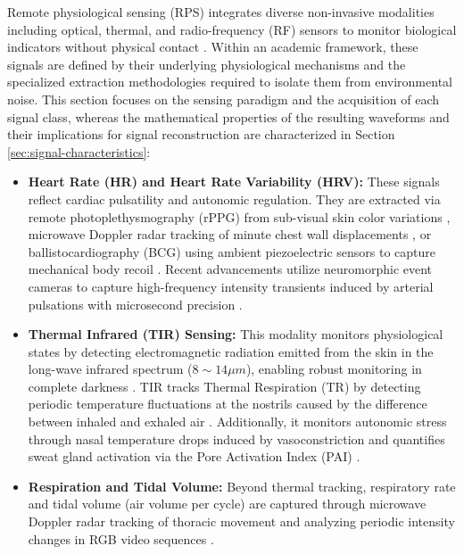 Remote physiological sensing (RPS) integrates diverse non-invasive modalities
including optical, thermal, and radio-frequency (RF) sensors to monitor
biological indicators without physical contact \cite{hassanpour2025contactless}.
Within an academic framework, these signals are defined by their underlying
physiological mechanisms and the specialized extraction methodologies required
to isolate them from environmental noise. This section focuses on the sensing
paradigm and the acquisition of each signal class, whereas the mathematical
properties of the resulting waveforms and their implications for signal
reconstruction are characterized in Section \ref{sec:signal-characteristics}:
\begin{itemize}
    \item \textbf{Heart Rate (HR) and Heart Rate Variability (HRV):} These
        signals reflect cardiac pulsatility and autonomic regulation. They are extracted
        via remote photoplethysmography (rPPG) from sub-visual skin color variations
        \cite{wang2017algorithmic}, microwave Doppler radar tracking of minute
        chest wall displacements \cite{islam2022radar}, or ballistocardiography (BCG)
        using ambient piezoelectric sensors to capture mechanical body recoil \cite{kjaer2026bcgfm}.
        Recent advancements utilize neuromorphic event cameras to capture high-frequency
        intensity transients induced by arterial pulsations with microsecond
        precision \cite{feng2026empd}.

    \item \textbf{Thermal Infrared (TIR) Sensing:} This modality monitors
        physiological states by detecting electromagnetic radiation emitted from
        the skin in the long-wave infrared spectrum ($8 \sim 14 \mu m$), enabling
        robust monitoring in complete darkness \cite{cho2019physiological}. TIR
        tracks Thermal Respiration (TR) by detecting periodic temperature
        fluctuations at the nostrils caused by the difference between inhaled
        and exhaled air \cite{cho2019physiological}. Additionally, it monitors
        autonomic stress through nasal temperature drops induced by
        vasoconstriction and quantifies sweat gland activation via the Pore
        Activation Index (PAI) \cite{cho2019physiological}.

    \item \textbf{Respiration and Tidal Volume:} Beyond thermal tracking, respiratory
        rate and tidal volume (air volume per cycle) are captured through microwave
        Doppler radar tracking of thoracic movement \cite{islam2022radar} and analyzing
        periodic intensity changes in RGB video sequences \cite{hassanpour2025contactless}.


\end{itemize}
